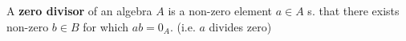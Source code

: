 \begin{definition}\label{d:zero-divisor}
	A \textbf{zero divisor} of an algebra $A$ is a non-zero element $a \in A$ s. that there exists non-zero $b \in B$ for which $ab = 0_A$. (i.e. $a$ divides zero)
\end{definition}
